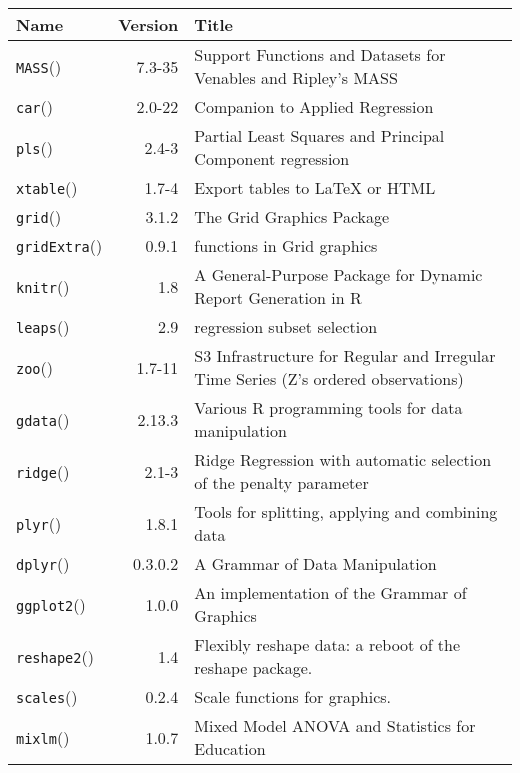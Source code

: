 \documentclass[12pt, lot, lof]{thesis}\usepackage[]{graphicx}\usepackage[]{color}
\begin{document}
\begin{tabularx}{\textwidth}{lrX}
  \toprule
Name & Version & Title \\ 
  \hline \endhead  \midrule
\texttt{MASS}(\cite{MASS2001WNV}) & 7.3-35 & Support Functions and Datasets for Venables and Ripley's MASS \\ 
  \texttt{car}(\cite{car2011FJnWS}) & 2.0-22 & Companion to Applied Regression \\ 
  \texttt{pls}(\cite{pls2013MBH}) & 2.4-3 & Partial Least Squares and Principal Component regression \\ 
  \texttt{xtable}(\cite{xtable2014DD}) & 1.7-4 & Export tables to LaTeX or HTML \\ 
  \texttt{grid}(\cite{gridExtra2012AB}) & 3.1.2 & The Grid Graphics Package \\ 
  \texttt{gridExtra}(\cite{gridExtra2012AB}) & 0.9.1 & functions in Grid graphics \\ 
  \texttt{knitr}(\cite{knitr2013XY}) & 1.8 & A General-Purpose Package for Dynamic Report Generation in R \\ 
  \texttt{leaps}(\cite{leaps2009LT}) & 2.9 & regression subset selection \\ 
  \texttt{zoo}(\cite{zoo2005ZAGG}) & 1.7-11 & S3 Infrastructure for Regular and Irregular Time Series (Z's
ordered observations) \\ 
  \texttt{gdata}(\cite{gdata2014WG}) & 2.13.3 & Various R programming tools for data manipulation \\ 
  \texttt{ridge}(\cite{ridge2014CE}) & 2.1-3 & Ridge Regression with automatic selection of the penalty
parameter \\ 
  \texttt{plyr}(\cite{plyr2011WH}) & 1.8.1 & Tools for splitting, applying and combining data \\ 
  \texttt{dplyr}(\cite{dplyr2014WHFR}) & 0.3.0.2 & A Grammar of Data Manipulation \\ 
  \texttt{ggplot2}(\cite{ggplot22009WH}) & 1.0.0 & An implementation of the Grammar of Graphics \\ 
  \texttt{reshape2}(\cite{reshape22007WH}) & 1.4 & Flexibly reshape data: a reboot of the reshape package. \\ 
  \texttt{scales}(\cite{scales:2014Wickham}) & 0.2.4 & Scale functions for graphics. \\ 
  \texttt{mixlm}(\cite{mixlm2014SK}) & 1.0.7 & Mixed Model ANOVA and Statistics for Education \\ 

\end{tabularx}
\end{document}
